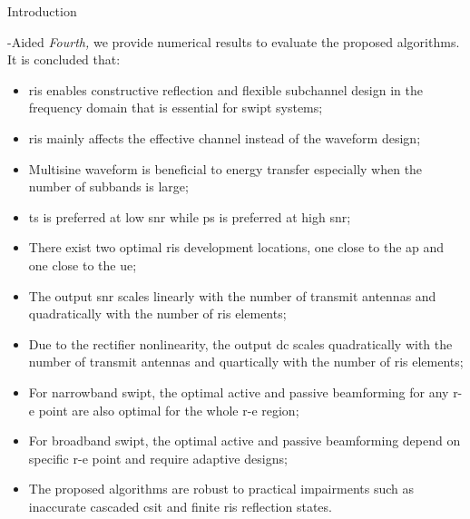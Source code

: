 \begin{section}{Introduction}
\begin{subsection}{-Aided }
		\emph{Fourth,} we provide numerical results to evaluate the proposed algorithms. It is concluded that:
		\begin{itemize}
			\item \gls{ris} enables constructive reflection and flexible subchannel design in the frequency domain that is essential for \gls{swipt} systems;
			\item \gls{ris} mainly affects the effective channel instead of the waveform design;
			\item Multisine waveform is beneficial to energy transfer especially when the number of subbands is large;
			\item \gls{ts} is preferred at low \gls{snr} while \gls{ps} is preferred at high \gls{snr};
			\item There exist two optimal \gls{ris} development locations, one close to the \gls{ap} and one close to the \gls{ue};
			\item The output \gls{snr} scales linearly with the number of transmit antennas and quadratically with the number of \gls{ris} elements;
			\item Due to the rectifier nonlinearity, the output \gls{dc} scales quadratically with the number of transmit antennas and quartically with the number of \gls{ris} elements;
			\item For narrowband \gls{swipt}, the optimal active and passive beamforming for any \gls{r-e} point are also optimal for the whole \gls{r-e} region;
			\item For broadband \gls{swipt}, the optimal active and passive beamforming depend on specific \gls{r-e} point and require adaptive designs;
			\item The proposed algorithms are robust to practical impairments such as inaccurate cascaded \gls{csit} and finite \gls{ris} reflection states.
		\end{itemize}
	\end{subsection}
\end{section}

